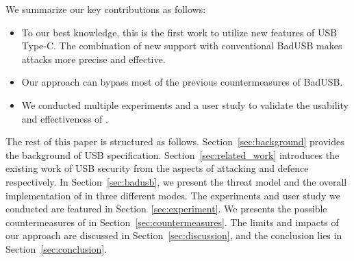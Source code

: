 We summarize our key contributions as follows:
\begin{itemize}
	\item To our best knowledge, this is the first work to utilize new features of USB Type-C.
	The combination of new support with conventional BadUSB makes attacks more precise and effective.
	\item Our approach can bypass most of the previous countermeasures of BadUSB.
	\item We conducted multiple experiments and a user study to validate the usability and effectiveness of \tool.  
\end{itemize}

The rest of this paper is structured as follows.
Section~\ref{sec:background} provides the background of USB specification.
Section~\ref{sec:related_work} introduces the existing work of USB security from the aspects of attacking and defence respectively.
In Section~\ref{sec:badusb}, we present the threat model and the overall implementation of \tool in three different modes.
The experiments and user study we conducted are featured in Section~\ref{sec:experiment}.
We presents the possible countermeasures of \tool in Section~\ref{sec:countermeasures}.
The limits and impacts of our approach are discussed in Section~\ref{sec:discussion}, and the conclusion lies in Section~\ref{sec:conclusion}.














